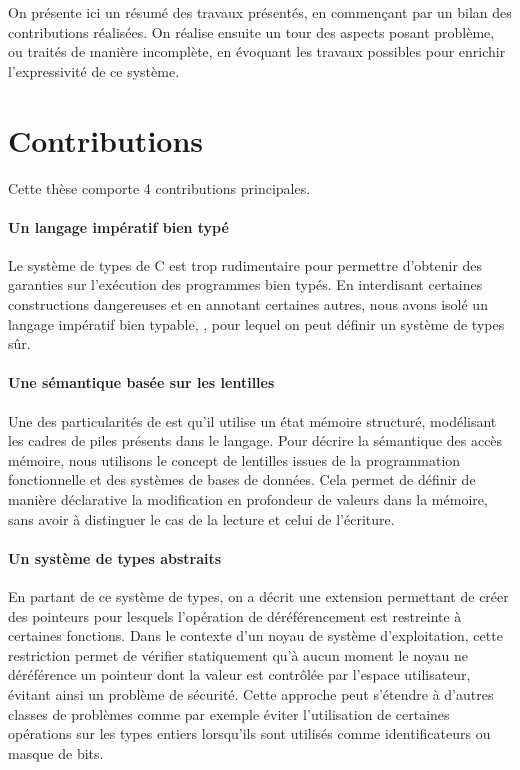 On présente ici un résumé des travaux présentés, en commençant par un bilan des
contributions réalisées. On réalise ensuite un tour des aspects posant problème,
ou traités de manière incomplète, en évoquant les travaux possibles pour
enrichir l'expressivité de ce système.

\section{Contributions}

Cette thèse comporte 4 contributions principales.

\paragraph{Un langage impératif bien typé}

Le système de types de C est trop rudimentaire pour permettre d'obtenir des
garanties sur l'exécution des programmes bien typés. En interdisant certaines
constructions dangereuses et en annotant certaines autres, nous avons isolé un
langage impératif bien typable, \langname, pour lequel on peut définir un
système de types sûr.

\paragraph{Une sémantique basée sur les lentilles}

Une des particularités de \langname est qu'il utilise un état mémoire structuré,
modélisant les cadres de piles présents dans le langage. Pour décrire la
sémantique des accès mémoire, nous utilisons le concept de lentilles issues de
la programmation fonctionnelle et des systèmes de bases de données. Cela permet
de définir de manière déclarative la modification en profondeur de valeurs dans
la mémoire, sans avoir à distinguer le cas de la lecture et celui de l'écriture.

\paragraph{Un système de types abstraits}

En partant de ce système de types, on a décrit une extension permettant de créer
des pointeurs pour lesquels l'opération de déréférencement est restreinte à
certaines fonctions. Dans le contexte d'un noyau de système d'exploitation,
cette restriction permet de vérifier statiquement qu'à aucun moment le noyau ne
déréférence un pointeur dont la valeur est contrôlée par l'espace utilisateur,
évitant ainsi un problème de sécurité. Cette approche peut s'étendre à d'autres
classes de problèmes comme par exemple éviter l'utilisation de certaines
opérations sur les types entiers lorsqu'ils sont utilisés comme identificateurs
ou masque de bits.

